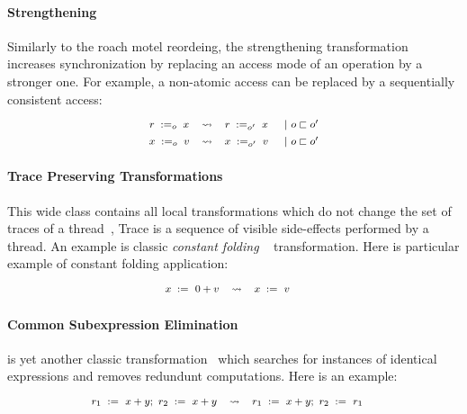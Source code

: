 \paragraph{Strengthening}

Similarly to the roach motel reordeing, the strengthening
transformation increases synchronization by 
replacing an access mode of an operation by a stronger one. 
For example, a non-atomic access can be replaced by 
a sequentially consistent access: 
%
\[\def\arraystretch{1.4}\footnotesize
  \begin{array}{cccl} 

      \readInst{o}{r}{x} 
    & \leadsto 
    & \readInst{o'}{r}{x}
    & ~|~ o \sqsubset o' \\ 

      \writeInst{o}{x}{v}
    & \leadsto 
    & \writeInst{o'}{x}{v}
    & ~|~ o \sqsubset o'  \\ 

  \end{array}
\]

\paragraph{Trace Preserving Transformations}

This wide class contains all local transformations 
which do not change the set of traces of a thread~\cite{Sevcik-Aspinall:ECOOP08},
Trace is a sequence of visible side-effects performed by a thread. 
An example is classic \emph{constant folding}%
~\cite{Muchnick:ACDI97, Wegman-Zadeck:TOPLAS91} transformation.
Here is particular example of constant folding application:
%
\[\def\arraystretch{1.4}\footnotesize
  \begin{array}{cccl} 

      \writeInst{}{x}{0 + v} 
    & \leadsto 
    & \writeInst{}{x}{v}
    & \\ 

  \end{array}
\]
  
\paragraph{Common Subexpression Elimination}

\CSE is yet another classic transformation~\cite{Muchnick:ACDI97} 
which searches for instances of identical expressions 
and removes redundunt computations. 
Here is an example: 
%
\[\def\arraystretch{1.4}\footnotesize
  \begin{array}{cccl} 

      \readInst{}{r_1}{x + y} \seq \readInst{}{r_2}{x + y} 
    & \leadsto 
    & \readInst{}{r_1}{x + y} \seq \readInst{}{r_2}{r_1}
    & \\ 

  \end{array}
\]

